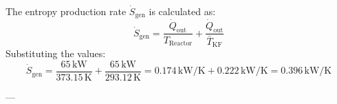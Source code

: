 The entropy production rate \( \dot{S}_{\text{gen}} \) is calculated as:  
\[
\dot{S}_{\text{gen}} = \frac{\dot{Q}_{\text{out}}}{T_{\text{Reactor}}} + \frac{\dot{Q}_{\text{out}}}{\bar{T}_{\text{KF}}}
\]  
Substituting the values:  
\[
\dot{S}_{\text{gen}} = \frac{65 \, \text{kW}}{373.15 \, \text{K}} + \frac{65 \, \text{kW}}{293.12 \, \text{K}} = 0.174 \, \text{kW/K} + 0.222 \, \text{kW/K} = 0.396 \, \text{kW/K}
\]

---